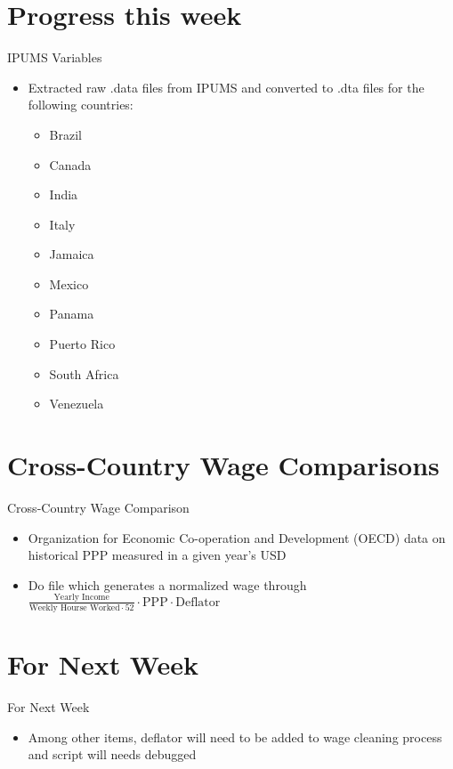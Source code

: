 \documentclass{beamer}
\begin{document}
\section{Progress this week}
\begin{frame}{IPUMS Variables}
    \begin{itemize}
        \item Extracted raw .data files from IPUMS and converted to .dta files for the following countries:
        \begin{itemize}
            \item Brazil
            \item Canada
            \item India
            \item Italy
            \item Jamaica
	    \item Mexico
	    \item Panama
            \item Puerto Rico
            \item South Africa
            \item Venezuela
        \end{itemize}
    \end{itemize}
\end{frame}

\section{Cross-Country Wage Comparisons}
\begin{frame}{Cross-Country Wage Comparison}
\begin{itemize}
\item  Organization for Economic Co-operation and Development (OECD) data on historical PPP measured in a given year's USD
\item Do file which generates a normalized wage through\\
$\frac{\text{Yearly Income}}{\text{Weekly Hourse Worked} \cdot 52}\cdot \text{PPP} \cdot \text{Deflator}$
\end{itemize}
\end{frame}

\section{For Next Week}
\begin{frame}{For Next Week}
\begin{itemize}
    \item Among other items, deflator will need to be added to wage cleaning process and script will needs debugged
\end{itemize}
\end{frame}
\end{document}

